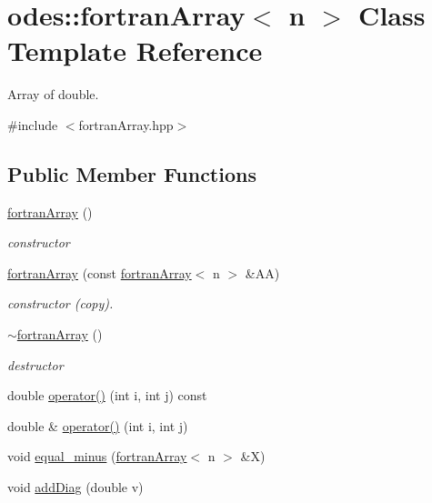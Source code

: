\hypertarget{classodes_1_1fortranArray}{}\section{odes\+:\+:fortran\+Array$<$ n $>$ Class Template Reference}
\label{classodes_1_1fortranArray}


Array of double.  




{\ttfamily \#include $<$fortran\+Array.\+hpp$>$}

\subsection*{Public Member Functions}
\begin{DoxyCompactItemize}
\item 
\hyperlink{classodes_1_1fortranArray_a8df00fb51f372f5094232edcef336c3f}{fortran\+Array} ()
\begin{DoxyCompactList}\small\item\em constructor \end{DoxyCompactList}\item 
\hyperlink{classodes_1_1fortranArray_a6497db7c1e408bf8888e29ed142fda94}{fortran\+Array} (const \hyperlink{classodes_1_1fortranArray}{fortran\+Array}$<$ n $>$ \&A\+A)
\begin{DoxyCompactList}\small\item\em constructor (copy). \end{DoxyCompactList}\item 
\hyperlink{classodes_1_1fortranArray_ac70234541156d66bceb76a914f7d7970}{$\sim$fortran\+Array} ()
\begin{DoxyCompactList}\small\item\em destructor \end{DoxyCompactList}\item 
double \hyperlink{classodes_1_1fortranArray_a8da3208d04c048239fc3a8584090d2da}{operator()} (int i, int j) const 
\item 
double \& \hyperlink{classodes_1_1fortranArray_a8c8bbde9344a64c1c3a26b30f1a6d56f}{operator()} (int i, int j)
\item 
void \hyperlink{classodes_1_1fortranArray_a2ee01351fbf74c6f7b5d158ee16c84a0}{equal\+\_\+minus} (\hyperlink{classodes_1_1fortranArray}{fortran\+Array}$<$ n $>$ \&X)
\item 
void \hyperlink{classodes_1_1fortranArray_a5ada5ca2fd55f5e5dfb339de35b9f5ad}{add\+Diag} (double v)

\end{DoxyCompactItemize}
